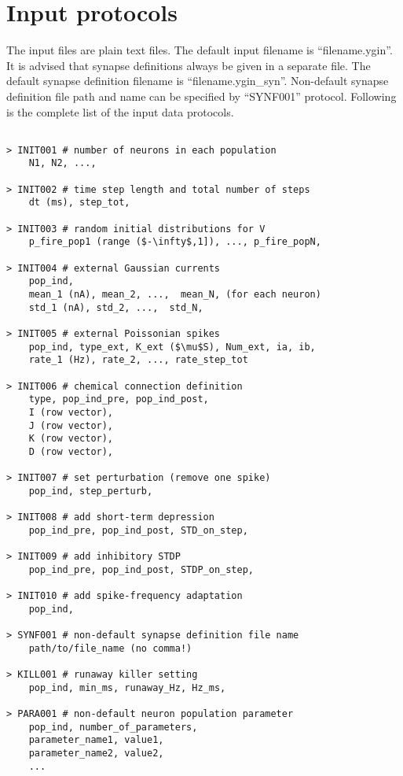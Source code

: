 \documentclass{article}
\begin{document}
\section{Input protocols}
\label{sec:Input protocols}

The input files are plain text files.
The default input filename is ``filename.ygin''.
It is advised that synapse definitions always be given in a separate file.
The default synapse definition filename is ``filename.ygin\_syn''.
Non-default synapse definition file path and name can be specified by ``SYNF001'' protocol.
Following is the complete list of  the input data protocols.




\begin{lstlisting}[mathescape]

> INIT001 # number of neurons in each population
	N1, N2, ...,

> INIT002 # time step length and total number of steps
	dt (ms), step_tot,

> INIT003 # random initial distributions for V
	p_fire_pop1 (range ($-\infty$,1]), ..., p_fire_popN, 

> INIT004 # external Gaussian currents
	pop_ind, 
	mean_1 (nA), mean_2, ...,  mean_N, (for each neuron)
	std_1 (nA), std_2, ...,  std_N, 

> INIT005 # external Poissonian spikes
	pop_ind, type_ext, K_ext ($\mu$S), Num_ext, ia, ib,
	rate_1 (Hz), rate_2, ..., rate_step_tot

> INIT006 # chemical connection definition
	type, pop_ind_pre, pop_ind_post,
	I (row vector),
	J (row vector),
	K (row vector),
	D (row vector),

> INIT007 # set perturbation (remove one spike)
	pop_ind, step_perturb,

> INIT008 # add short-term depression
	pop_ind_pre, pop_ind_post, STD_on_step,

> INIT009 # add inhibitory STDP
	pop_ind_pre, pop_ind_post, STDP_on_step,
	
> INIT010 # add spike-frequency adaptation 
	pop_ind,
	
> SYNF001 # non-default synapse definition file name
	path/to/file_name (no comma!)

> KILL001 # runaway killer setting
	pop_ind, min_ms, runaway_Hz, Hz_ms,

> PARA001 # non-default neuron population parameter
	pop_ind, number_of_parameters,
	parameter_name1, value1,
	parameter_name2, value2,
	...
 

\end{lstlisting}
\end{document}
